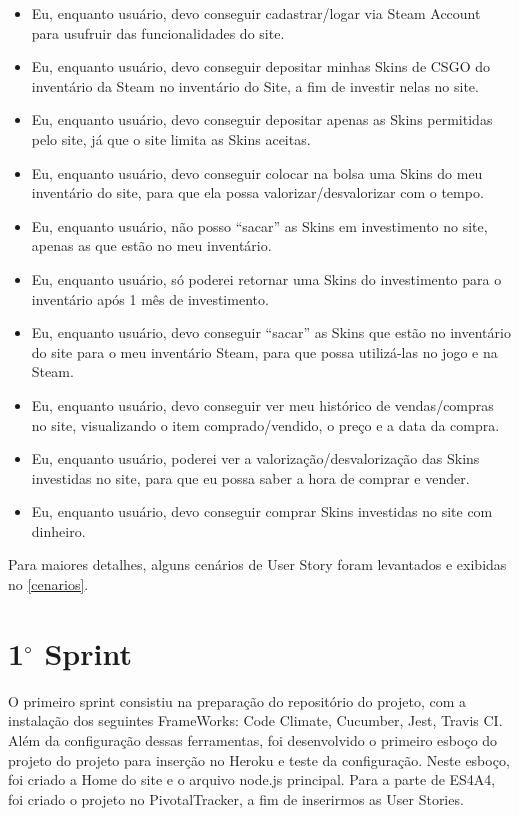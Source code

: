 \begin{itemize}
\item Eu, enquanto usuário, devo conseguir cadastrar/logar via Steam Account para usufruir das 
funcionalidades do site.

\item Eu, enquanto usuário, devo conseguir depositar minhas Skins de CSGO do inventário da Steam no 
inventário do Site, a fim de investir nelas no site.

\item Eu, enquanto usuário, devo conseguir depositar apenas as Skins permitidas pelo site, já que o 
site limita as Skins aceitas.

\item Eu, enquanto usuário, devo conseguir colocar na bolsa uma Skins do meu inventário do site, para 
que ela possa valorizar/desvalorizar com o tempo.

\item Eu, enquanto usuário, não posso ``sacar'' as Skins em investimento no site, apenas as que estão no 
meu inventário.

\item Eu, enquanto usuário, só poderei retornar uma Skins do investimento para o inventário após 1 mês 
de investimento.

\item Eu, enquanto usuário, devo conseguir ``sacar'' as Skins que estão no inventário do site para o meu 
inventário Steam, para que possa utilizá-las no jogo e na Steam.

\item Eu, enquanto usuário, devo conseguir ver meu histórico de vendas/compras no site, visualizando o 
item comprado/vendido, o preço e a data da compra.

\item Eu, enquanto usuário, poderei ver a valorização/desvalorização das Skins investidas no site, para 
que eu possa saber a hora de comprar e vender.

\item Eu, enquanto usuário, devo conseguir comprar Skins investidas no site com dinheiro.
\end{itemize}

Para maiores detalhes, alguns cenários de User Story foram levantados e exibidas no \autoref{cenarios}.

\section{1$^{\circ}$ Sprint}
O primeiro sprint consistiu na preparação do repositório do projeto, com a instalação dos seguintes
FrameWorks: Code Climate, Cucumber, Jest, Travis CI. Além da configuração dessas ferramentas,
foi desenvolvido o primeiro esboço do projeto do projeto para inserção no Heroku e teste da configuração.
Neste esboço, foi criado a Home do site e o arquivo node.js principal. Para a parte de ES4A4,
foi criado o projeto no PivotalTracker, a fim de inserirmos as User Stories.

